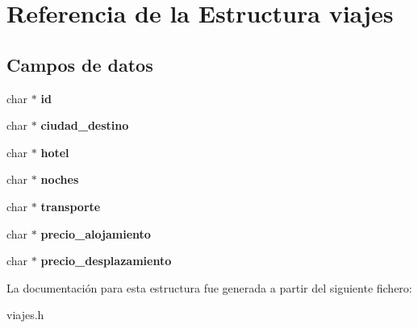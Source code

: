 \hypertarget{structviajes}{}\section{Referencia de la Estructura viajes}
\label{structviajes}
\subsection*{Campos de datos}
\begin{DoxyCompactItemize}
\item 
\mbox{\label{structviajes_aecb3b0d045ada529257a2fbf8f829599}} 
char $\ast$ {\bfseries id}
\item 
\mbox{\label{structviajes_a0fc927e65d3b9e8a40645c225b8c0f28}} 
char $\ast$ {\bfseries ciudad\+\_\+destino}
\item 
\mbox{\label{structviajes_afb7b1601ee625ba2c6df8104708777e6}} 
char $\ast$ {\bfseries hotel}
\item 
\mbox{\label{structviajes_a32df76c877ddaca650ce71909304675d}} 
char $\ast$ {\bfseries noches}
\item 
\mbox{\label{structviajes_a97f88c0832fcc4f5309e883235fabb41}} 
char $\ast$ {\bfseries transporte}
\item 
\mbox{\label{structviajes_a9378a713430847ac6a4fd84d69e0ef9c}} 
char $\ast$ {\bfseries precio\+\_\+alojamiento}
\item 
\mbox{\label{structviajes_aa80aca649779ffc4b1561b5e602fabfe}} 
char $\ast$ {\bfseries precio\+\_\+desplazamiento}
\end{DoxyCompactItemize}


La documentación para esta estructura fue generada a partir del siguiente fichero\+:\begin{DoxyCompactItemize}
\item 
viajes.\+h\end{DoxyCompactItemize}
